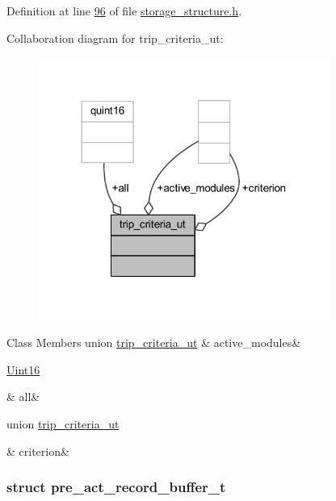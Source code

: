 Definition at line \hyperlink{a00003_source_l00096}{96} of file \hyperlink{a00003_source}{storage\+\_\+structure.\+h}.



Collaboration diagram for trip\+\_\+criteria\+\_\+ut\+:
\nopagebreak
\begin{figure}[H]
\begin{center}
\leavevmode
\includegraphics[width=270pt]{dc/d9a/a00218}
\end{center}
\end{figure}
\begin{DoxyFields}{Class Members}
\hypertarget{a00003_af3735c35dd4a424469d58e0c59b6ed12}{union \hyperlink{a00003_d5/db1/a00140}{trip\+\_\+criteria\+\_\+ut}}\label{a00003_af3735c35dd4a424469d58e0c59b6ed12}
&
active\+\_\+modules&
\\
\hline

\hypertarget{a00003_a3a4ea34ff84a869fc06d5088774a23dd}{\hyperlink{a00001_aae7407b021d43f7193a81a58cfb3e297}{Uint16}}\label{a00003_a3a4ea34ff84a869fc06d5088774a23dd}
&
all&
\\
\hline

\hypertarget{a00003_a68e5d717776b2535a1677a3b4a8e9472}{union \hyperlink{a00003_d2/d82/a00142}{trip\+\_\+criteria\+\_\+ut}}\label{a00003_a68e5d717776b2535a1677a3b4a8e9472}
&
criterion&
\\
\hline

\end{DoxyFields}
\label{d4/d7d/a00093}
\hypertarget{a00003_d4/d7d/a00093}{}
\subsubsection{struct pre\+\_\+act\+\_\+record\+\_\+buffer\+\_\+t}


